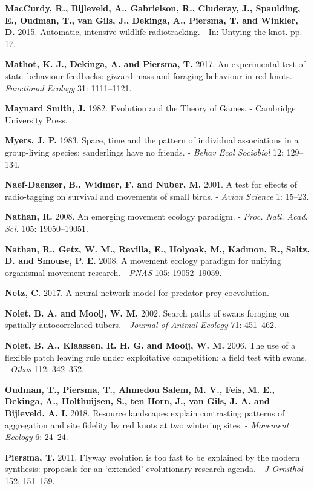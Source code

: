 \documentclass[]{scrartcl}
\begin{document}
\begin{multicols}{2}
\textbf{MacCurdy, R., Bijleveld, A., Gabrielson, R., Cluderay, J.,
Spaulding, E., Oudman, T., van Gils, J., Dekinga, A., Piersma, T. and
Winkler, D.} 2015. Automatic, intensive wildlife radiotracking. - In:
Untying the knot. pp. 17.

\textbf{Mathot, K. J., Dekinga, A. and Piersma, T.} 2017. An
experimental test of state--behaviour feedbacks: gizzard mass and
foraging behaviour in red knots. - \emph{Functional Ecology} 31:
1111--1121.

\textbf{Maynard Smith, J.} 1982. Evolution and the Theory of Games. -
Cambridge University Press.

\textbf{Myers, J. P.} 1983. Space, time and the pattern of individual
associations in a group-living species: sanderlings have no friends. -
\emph{Behav Ecol Sociobiol} 12: 129--134.

\textbf{Naef-Daenzer, B., Widmer, F. and Nuber, M.} 2001. A test for
effects of radio-tagging on survival and movements of small birds. -
\emph{Avian Science} 1: 15--23.

\textbf{Nathan, R.} 2008. An emerging movement ecology paradigm. -
\emph{Proc. Natl. Acad. Sci.} 105: 19050--19051.

\textbf{Nathan, R., Getz, W. M., Revilla, E., Holyoak, M., Kadmon, R.,
Saltz, D. and Smouse, P. E.} 2008. A movement ecology paradigm for
unifying organismal movement research. - \emph{PNAS} 105: 19052--19059.

\textbf{Netz, C.} 2017. A neural-network model for predator-prey
coevolution.

\textbf{Nolet, B. A. and Mooij, W. M.} 2002. Search paths of swans
foraging on spatially autocorrelated tubers. - \emph{Journal of Animal
Ecology} 71: 451--462.

\textbf{Nolet, B. A., Klaassen, R. H. G. and Mooij, W. M.} 2006. The use
of a flexible patch leaving rule under exploitative competition: a field
test with swans. - \emph{Oikos} 112: 342--352.

\textbf{Oudman, T., Piersma, T., Ahmedou Salem, M. V., Feis, M. E.,
Dekinga, A., Holthuijsen, S., ten Horn, J., van Gils, J. A. and
Bijleveld, A. I.} 2018. Resource landscapes explain contrasting patterns
of aggregation and site fidelity by red knots at two wintering sites. -
\emph{Movement Ecology} 6: 24--24.

\textbf{Piersma, T.} 2011. Flyway evolution is too fast to be explained
by the modern synthesis: proposals for an `extended' evolutionary
research agenda. - \emph{J Ornithol} 152: 151--159.


\end{multicols}
\end{document}
